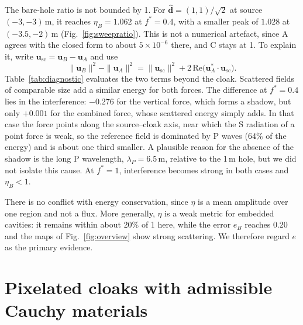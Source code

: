\documentclass[preprint,12pt]{elsarticle}
\newcommand{\mbf}[1]{\mathbf{#1}}
\newcommand{\be}{\begin{equation}}
\newcommand{\ee}{\end{equation}}
\begin{document}
The bare-hole ratio is not bounded by 1. For $\hat{\mbf{d}}=(1,1)/\sqrt{2}$ at source $(-3,-3)$\,m, it reaches $\eta_B=1.062$ at $f^*=0.4$, with a smaller peak of $1.028$ at $(-3.5,-2)$\,m (Fig.~\ref{fig:sweepratio}). This is not a numerical artefact, since A agrees with the closed form to about $5\times10^{-6}$ there, and C stays at 1. To explain it, write $\mathbf{u}_{\mathrm{sc}}=\mbf{u}_B-\mbf{u}_A$ and use
\be\label{eq:energy}
  \|\mbf{u}_B\|^2-\|\mbf{u}_A\|^2=\|\mbf{u}_{\mathrm{sc}}\|^2+2\,\mathrm{Re}\bigl(\mbf{u}_A^{*}\cdot\mbf{u}_{\mathrm{sc}}\bigr).
\ee
Table~\ref{tab:diagnostic} evaluates the two terms beyond the cloak. Scattered fields of comparable size add a similar energy for both forces. The difference at $f^*=0.4$ lies in the interference: $-0.276$ for the vertical force, which forms a shadow, but only $+0.001$ for the combined force, whose scattered energy simply adds. In that case the force points along the source--cloak axis, near which the S radiation of a point force is weak, so the reference field is dominated by P waves (64\% of the energy) and is about one third smaller. A plausible reason for the absence of the shadow is the long P wavelength, $\lambda_P=6.5$\,m, relative to the 1\,m hole, but we did not isolate this cause. At $f^*=1$, interference becomes strong in both cases and $\eta_B<1$.

There is no conflict with energy conservation, since $\eta$ is a mean amplitude over one region and not a flux. More generally, $\eta$ is a weak metric for embedded cavities: it remains within about 20\% of 1 here, while the error $e_B$ reaches 0.20 and the maps of Fig.~\ref{fig:overview} show strong scattering. We therefore regard $e$ as the primary evidence.

\begin{table}[!htb]
\centering\footnotesize
\caption{Decomposition~\eqref{eq:energy} beyond the cloak for the bare hole at source $(-3,-3)$\,m, where the off-axis distance is $d_\perp$.}
\label{tab:diagnostic}
\resizebox{\textwidth}{!}{}
\end{table}


\FloatBarrier
\section{Pixelated cloaks with admissible Cauchy materials}\label{sec:pixels}
\end{document}

